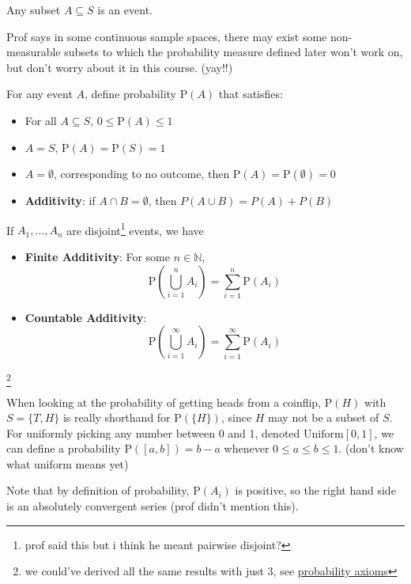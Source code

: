 \begin{definition}[Event]
Any subset $A \subseteq S$ is an event. 
\end{definition}
Prof says in some continuous sample spaces, there may exist some non-measurable subsets to which the probability measure defined later won't work on, but don't worry about it in this course. (yay!!)
\begin{definition}[Probability]
    For any event $A$, define probability $\mathrm{P}(A)$ that satisfies:
    \begin{itemize}
        \item For all $A \subseteq S$, $0 \leq \mathrm{P}(A) \leq 1$
        \item $A = S$, $\mathrm{P}(A) = \mathrm{P}(S) = 1$
        \item $A = \emptyset$, corresponding to no outcome, then $\mathrm{P}(A) = \mathrm{P}(\emptyset) = 0$
        \item \textbf{Additivity}: if $A \cap B = \emptyset$, then $P(A \cup B) = P(A) + P(B)$ \label{prop:probadd} 
    \end{itemize}
    If $A_1, \dots, A_n$ are disjoint\footnote{prof said this but i think he meant pairwise disjoint?} events, we have
    \begin{itemize}
        \item \textbf{Finite Additivity}: For some $n \in \mathbb{N}$,
\[
\mathrm{P}\left(\bigcup_{i = 1}^n A_i\right) = \sum_{i=1}^n \mathrm{P}(A_i)
\]
        \item \textbf{Countable Additivity}:
\[
\mathrm{P}\left(\bigcup_{i=1}^\infty A_i\right) = \sum_{i=1}^\infty \mathrm{P}(A_i)
\]
    \end{itemize}

\end{definition}\footnote{we could've derived all the same results with just 3, see \href{https://en.wikipedia.org/wiki/Probability_axioms}{probability axioms}}

When looking at the probability of getting heads from a coinflip, $\mathrm{P}(H)$ with $S = \{T, H\}$ is really shorthand for $\mathrm{P}(\{ H \})$, since $H$ may not be a subset of $S$. For uniformly picking any number between 0 and 1, denoted $\mathrm{Uniform}[0, 1]$, we can define a probability $\mathrm{P}([a, b]) = b - a$ whenever $0 \leq a \leq b \leq 1$. (don't know what uniform means yet)

Note that by definition of probability, $\mathrm{P}(A_i)$ is positive, so the right hand side is an absolutely convergent series (prof didn't mention this).
